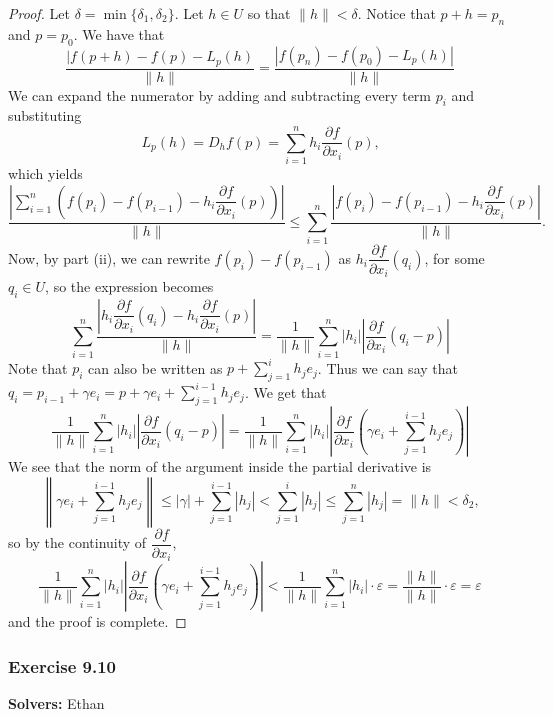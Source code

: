 \documentclass{article}
\theoremstyle{plain} %
\numberwithin{thm}{section} %
\theoremstyle{definition}
\begin{document}
\begin{proof}
        Let \(\delta = \min \{\delta _1, \delta _2 \}\). Let \(h \in U\) so that \(\|h\| < \delta\). Notice that \(p+h = p_n\) and \(p = p_0\). We have that
        \[
            \frac{|f(p+h) - f(p) - L_p(h)}{\|h\|} = \frac{|f(p_n) - f(p_0) - L_p(h)|}{\|h\|}
        \]
        We can expand the numerator by adding and subtracting every term \(p_i\) and substituting
        \[
            L_p(h) = D_h f (p) = \sum_{i=1}^n h_i \dfrac{\partial f}{\partial x_i}(p) \text{,} 
        \]
        which yields
        \[
            \frac{\left\vert \sum\limits_{i=1}^n \left(f(p_i) - f(p_{i-1}) - h_i\dfrac{\partial f}{\partial x_i}(p) \right)\right\vert}{\|h\|} \leq \sum_{i=1}^n \frac{\left\vert f(p_i) - f(p_{i-1}) - h_i \dfrac{\partial f}{\partial x_i} (p) \right\vert }{\|h\|} \text{.} 
        \]
        Now, by part (ii), we can rewrite \(f(p_i) - f(p_{i-1})\) as \(h_i \dfrac{\partial f}{\partial x_i} (q_i)\), for some \(q_i \in U\), so the expression becomes
        \[
            \sum_{i=1}^n \frac{\left\vert h_i \dfrac{\partial f}{\partial x_i} (q_i) - h_i \dfrac{\partial f}{\partial x_i} (p) \right\vert}{\|h\|} = \frac{1}{\|h\|}\sum_{i=1}^n |h_i| \left\vert\dfrac{\partial f}{\partial x_i} (q_i - p)\right\vert
        \]
        Note that \(p_i\) can also be written as \(p + \sum_{j=1}^i h_j e_j\). Thus we can say that \(q_i = p_{i-1} + \gamma e_i = p + \gamma e_i + \sum_{j=1}^{i-1} h_j e_j\). We get that
        \[
            \frac{1}{\|h\|}\sum_{i=1}^n |h_i| \left\vert\dfrac{\partial f}{\partial x_i} (q_i - p)\right\vert = \frac{1}{\|h\|}\sum_{i=1}^n |h_i| \left\vert\dfrac{\partial f}{\partial x_i} \left(\gamma e_i + \sum_{j=1}^{i-1} h_j e_j\right)\right\vert
        \]
        We see that the norm of the argument inside the partial derivative is
        \[
            \left\lVert \gamma e_i + \sum_{j=1}^{i-1} h_j e_j \right\rVert \leq |\gamma| + \sum_{j=1}^{i-1} |h_j| < \sum_{j=1}^i |h_j| \leq \sum_{j=1}^n |h_j| = \|h\| < \delta _2 \text{,} 
        \]
        so by the continuity of \(\dfrac{\partial f}{\partial x_i}\),
        \[
            \frac{1}{\|h\|}\sum_{i=1}^n |h_i| \left\vert\dfrac{\partial f}{\partial x_i} \left(\gamma e_i + \sum_{j=1}^{i-1} h_j e_j\right)\right\vert < \frac{1}{\|h\|}\sum_{i=1}^n |h_i| \cdot \varepsilon = \frac{\|h\|}{\|h\|} \cdot \varepsilon = \varepsilon
        \]
        and the proof is complete.

    \end{proof}

    \subsubsection{Exercise 9.10}
    \textbf{Solvers:} Ethan
\end{document}
